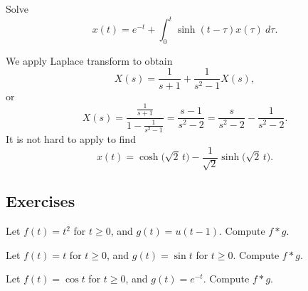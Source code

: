 \begin{example}
Solve
\begin{equation*}
x(t) =  e^{-t} + \int_0^t \sinh(t-\tau) x(\tau) ~ d\tau .
\end{equation*}

We apply Laplace transform to obtain
\begin{equation*}
X(s) = \frac{1}{s+1} + \frac{1}{s^2-1} X(s) ,
\end{equation*}
or
\begin{equation*}
X(s) = \frac{\frac{1}{s+1}}{1- \frac{1}{s^2-1}}
=
\frac{s-1}{s^2 - 2}
=
\frac{s}{s^2 - 2}
-
\frac{1}{s^2 - 2} .
\end{equation*}
It is not hard to apply  to find
\begin{equation*}
x(t) = \cosh \bigl( \sqrt{2} \, t \bigr) -
\frac{1}{\sqrt{2}} \sinh \bigl( \sqrt{2}\, t \bigr).
\end{equation*}
\end{example}

\subsection{Exercises}

\begin{exercise}
Let $f(t) = t^2$ for $t \geq 0$, and $g(t) = u(t-1)$.  Compute
$f * g$.
\end{exercise}

\begin{exercise}
Let $f(t) = t$ for $t \geq 0$, and $g(t) = \sin t $ for $t \geq 0$.  Compute
$f * g$.
\end{exercise}

\begin{exercise}
	Let $f(t) = \cos t$ for $t \geq 0$, and $g(t) = e^{-t}$.  Compute
	$f * g$.
\end{exercise}

